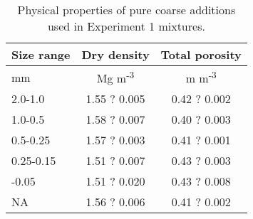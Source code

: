 \documentclass{article}
\begin{document}
\begin{table}

\caption{Physical properties of pure coarse additions used in Experiment 1 mixtures.}
\centering
\begin{tabular}[t]{lcc}
\toprule
\textbf{Size range} & \textbf{Dry density} & \textbf{Total porosity}\\
\midrule
mm & Mg m\textsuperscript{-3} & m m\textsuperscript{-3}\\
\midrule
2.0-1.0 & 1.55 ? 0.005 & 0.42 ? 0.002\\
1.0-0.5 & 1.58 ? 0.007 & 0.40 ? 0.003\\
0.5-0.25 & 1.57 ? 0.003 & 0.41 ? 0.001\\
0.25-0.15 & 1.51 ? 0.007 & 0.43 ? 0.003\\
\addlinespace
0.15-0.05 & 1.51 ? 0.020 & 0.43 ? 0.008\\
NA & 1.56 ? 0.006 & 0.41 ? 0.002\\
\bottomrule
\end{tabular}
\end{table}
\end{document}
